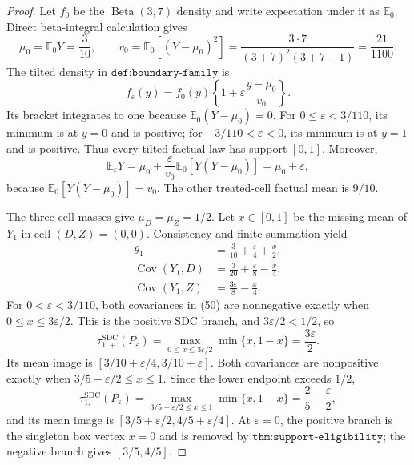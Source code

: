 \documentclass{article}
\begin{document}
\begin{proof}
Let \(f_0\) be the \(\operatorname{Beta}(3,7)\) density and write expectation under it as \(\mathbb E_0\).  Direct beta-integral calculation gives
\[
 \mu_0=\mathbb E_0Y=\frac3{10},\qquad
 v_0=\mathbb E_0[(Y-\mu_0)^2]
 =\frac{3\cdot7}{(3+7)^2(3+7+1)}=\frac{21}{1100}.                            \tag{48}
\]
The tilted density in \(\texttt{def:boundary-family}\) is
\[
 f_\varepsilon(y)=f_0(y)\left\{1+\varepsilon\frac{y-\mu_0}{v_0}\right\}.
\]
Its bracket integrates to one because \(\mathbb E_0(Y-\mu_0)=0\).  For \(0\le\varepsilon<3/110\), its minimum is at \(y=0\) and is positive; for \(-3/110<\varepsilon<0\), its minimum is at \(y=1\) and is positive.  Thus every tilted factual law has support \([0,1]\).  Moreover,
\[
 \mathbb E_\varepsilon Y
 =\mu_0+\frac{\varepsilon}{v_0}\mathbb E_0[Y(Y-\mu_0)]
 =\mu_0+\varepsilon,                                                         \tag{49}
\]
because \(\mathbb E_0[Y(Y-\mu_0)]=v_0\).  The other treated-cell factual mean is \(9/10\).

The three cell masses give \(\mu_D=\mu_Z=1/2\).  Let \(x\in[0,1]\) be the missing mean of \(Y_1\) in cell \((D,Z)=(0,0)\).  Consistency and finite summation yield
\[
 \begin{aligned}
 \theta_1&=\frac3{10}+\frac{\varepsilon}{4}+\frac{x}{2},\\
 \operatorname{Cov}(Y_1,D)&=\frac3{20}+\frac{\varepsilon}{8}-\frac{x}{4},\\
 \operatorname{Cov}(Y_1,Z)&=\frac{3\varepsilon}{8}-\frac{x}{4}.
 \end{aligned}                                                               \tag{50}
\]
For \(0<\varepsilon<3/110\), both covariances in (50) are nonnegative exactly when \(0\le x\le3\varepsilon/2\).  This is the positive SDC branch, and \(3\varepsilon/2<1/2\), so
\[
 \tau_{1,+}^{\mathrm{SDC}}(P_\varepsilon)
 =\max_{0\le x\le3\varepsilon/2}\min\{x,1-x\}
 =\frac{3\varepsilon}{2}.                                                     \tag{51}
\]
Its mean image is \([3/10+\varepsilon/4,3/10+\varepsilon]\).  Both covariances are nonpositive exactly when
\(3/5+\varepsilon/2\le x\le1\).  Since the lower endpoint exceeds \(1/2\),
\[
 \tau_{1,-}^{\mathrm{SDC}}(P_\varepsilon)
 =\max_{3/5+\varepsilon/2\le x\le1}\min\{x,1-x\}
 =\frac25-\frac{\varepsilon}{2},                                             \tag{52}
\]
and its mean image is \([3/5+\varepsilon/2,4/5+\varepsilon/4]\).  At \(\varepsilon=0\), the positive branch is the singleton box vertex \(x=0\) and is removed by \(\texttt{thm:support-eligibility}\); the negative branch gives \([3/5,4/5]\).


\end{proof}
\end{document}
